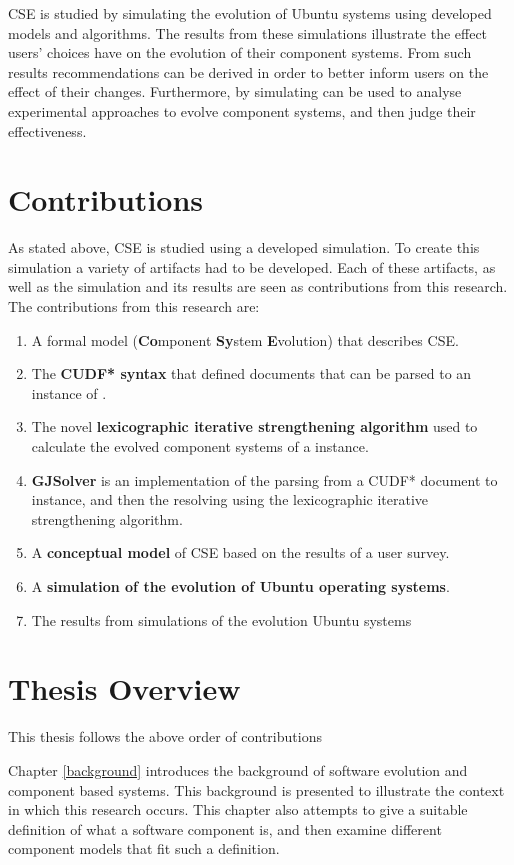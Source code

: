 CSE is studied by simulating the evolution of Ubuntu systems using developed models and algorithms.
The results from these simulations illustrate the effect users' choices have on the evolution of their component systems.
From such results recommendations can be derived in order to better inform users on the effect of their changes.
Furthermore, by simulating can be used to analyse experimental approaches to evolve component systems, and then judge their effectiveness.

\section{Contributions}
As stated above, CSE is studied using a developed simulation.
To create this simulation a variety of artifacts had to be developed.
Each of these artifacts, as well as the simulation and its results are seen as contributions from this research. 
The contributions from this research are:
\begin{enumerate}
  \item A formal model \textbf{\modelname} (\textbf{Co}mponent \textbf{Sy}stem \textbf{E}volution) that describes CSE. 
  \item The \textbf{CUDF* syntax} that defined documents that can be parsed to an instance of \modelname.
  \item The novel \textbf{lexicographic iterative strengthening algorithm} used to calculate the evolved component systems of a \modelname instance.
  \item \textbf{GJSolver} is an implementation of the parsing from a CUDF* document to \modelname instance, and then the resolving using the lexicographic iterative strengthening algorithm.
  \item A \textbf{conceptual model} of CSE based on the results of a user survey. 
  \item A \textbf{simulation of the evolution of Ubuntu operating systems}.
  \item The results from simulations of the evolution Ubuntu systems
\end{enumerate}

\section{Thesis Overview}
This thesis follows the above order of contributions

Chapter \ref{background} introduces the background of software evolution and component based systems.
This background is presented to illustrate the context in which this research occurs.
This chapter also attempts to give a suitable definition of what a software component is, and then examine different component models that fit such a definition.

